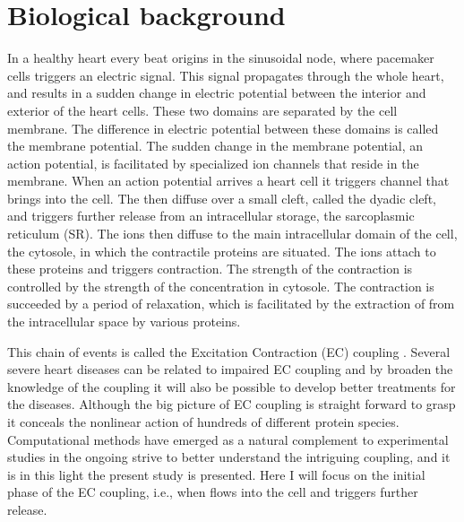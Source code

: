 \section{Biological background}
\label{sec:morphology}
In a healthy heart every beat origins in the sinusoidal node, where pacemaker cells triggers an electric signal. This signal propagates through the whole heart, and results in a sudden change in electric potential between the interior and exterior of the heart cells. These two domains are separated by the cell membrane. The difference in electric potential between these domains is called the membrane potential. The sudden change in the membrane potential, an action potential, is facilitated by specialized ion channels that reside in the membrane. When an action potential arrives a heart cell it triggers \Ca channel that brings \Ca into the cell. The \Ca then diffuse over a small cleft, called the dyadic cleft, and triggers further \Ca release from an intracellular \Ca storage, the sarcoplasmic reticulum (SR). The \Ca ions then diffuse to the main intracellular domain of the cell, the cytosole, in which the contractile proteins are situated. The \Ca ions attach to these proteins and triggers contraction. The strength of the contraction is controlled by the strength of the \Ca concentration in cytosole. The contraction is succeeded by a period of relaxation, which is facilitated by the extraction of \Ca from the intracellular space by various proteins. \par

This chain of events is called the Excitation Contraction (EC) coupling \cite{Bers_2001_book}. Several severe heart diseases can be related to impaired EC coupling and by broaden the knowledge of the coupling it will also be possible to develop better treatments for the diseases. Although the big picture of EC coupling is straight forward to grasp it conceals the nonlinear action of hundreds of different protein species. Computational methods have emerged as a natural complement to experimental studies in the ongoing strive to better understand the intriguing coupling, and it is in this light the present study is presented. Here I will focus on the initial phase of the EC coupling, i.e., when \Ca flows into the cell and triggers further \Ca release.\par

